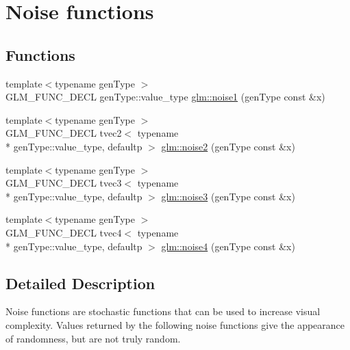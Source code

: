 \hypertarget{group__core__func__noise}{\section{Noise functions}
\label{group__core__func__noise}
}
\subsection*{Functions}
\begin{DoxyCompactItemize}
\item 
{\footnotesize template$<$typename gen\-Type $>$ }\\G\-L\-M\-\_\-\-F\-U\-N\-C\-\_\-\-D\-E\-C\-L gen\-Type\-::value\-\_\-type \hyperlink{group__core__func__noise_gadcbf14e3390990f33fda02bb20836960}{glm\-::noise1} (gen\-Type const \&x)
\item 
{\footnotesize template$<$typename gen\-Type $>$ }\\G\-L\-M\-\_\-\-F\-U\-N\-C\-\_\-\-D\-E\-C\-L tvec2$<$ typename \\*
gen\-Type\-::value\-\_\-type, defaultp $>$ \hyperlink{group__core__func__noise_gad88de7f308dc57edb80690373a1380a9}{glm\-::noise2} (gen\-Type const \&x)
\item 
{\footnotesize template$<$typename gen\-Type $>$ }\\G\-L\-M\-\_\-\-F\-U\-N\-C\-\_\-\-D\-E\-C\-L tvec3$<$ typename \\*
gen\-Type\-::value\-\_\-type, defaultp $>$ \hyperlink{group__core__func__noise_ga3359a5e2b61cee8cf4498470a63f7283}{glm\-::noise3} (gen\-Type const \&x)
\item 
{\footnotesize template$<$typename gen\-Type $>$ }\\G\-L\-M\-\_\-\-F\-U\-N\-C\-\_\-\-D\-E\-C\-L tvec4$<$ typename \\*
gen\-Type\-::value\-\_\-type, defaultp $>$ \hyperlink{group__core__func__noise_gaed96a491dd0c552040d59f9178bc626d}{glm\-::noise4} (gen\-Type const \&x)
\end{DoxyCompactItemize}


\subsection{Detailed Description}
Noise functions are stochastic functions that can be used to increase visual complexity. Values returned by the following noise functions give the appearance of randomness, but are not truly random. 

